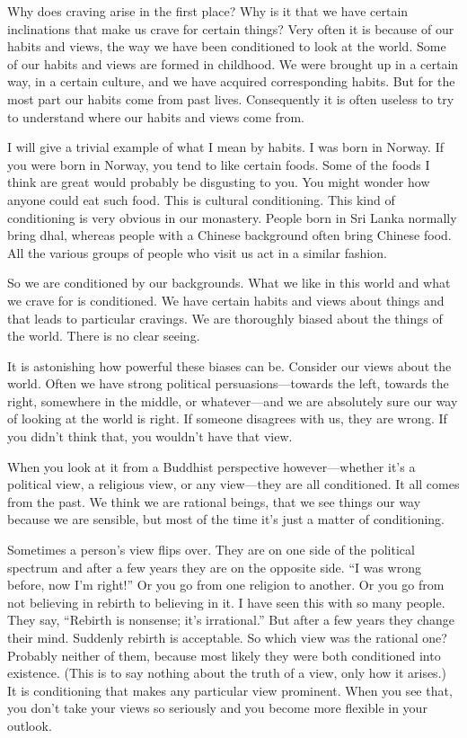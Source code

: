 \documentclass[12pt,openany]{book}
\begin{document}
Why does craving arise in the first place? Why is it that we have certain inclinations that make us crave for certain things? Very often it is because of our habits and views, the way we have been conditioned to look at the world. Some of our habits and views are formed in childhood. We were brought up in a certain way, in a certain culture, and we have acquired corresponding habits. But for the most part our habits come from past lives. Consequently it is often useless to try to understand where our habits and views come from.

I will give a trivial example of what I mean by habits. I was born in Norway. If you were born in Norway, you tend to like certain foods. Some of the foods I think are great would probably be disgusting to you. You might wonder how anyone could eat such food. This is cultural conditioning. This kind of conditioning is very obvious in our monastery. People born in Sri Lanka normally bring dhal, whereas people with a Chinese background often bring Chinese food. All the various groups of people who visit us act in a similar fashion.

So we are conditioned by our backgrounds. What we like in this world and what we crave for is conditioned. We have certain habits and views about things and that leads to particular cravings. We are thoroughly biased about the things of the world. There is no clear seeing.

It is astonishing how powerful these biases can be. Consider our views about the world. Often we have strong political persuasions—towards the left, towards the right, somewhere in the middle, or whatever—and we are absolutely sure our way of looking at the world is right. If someone disagrees with us, they are wrong. If you didn’t think that, you wouldn’t have that view.

When you look at it from a Buddhist perspective however—whether it’s a political view, a religious view, or any view—they are all conditioned. It all comes from the past. We think we are rational beings, that we see things our way because we are sensible, but most of the time it’s just a matter of conditioning.

Sometimes a person’s view flips over. They are on one side of the political spectrum and after a few years they are on the opposite side. “I was wrong before, now I’m right!” Or you go from one religion to another. Or you go from not believing in rebirth to believing in it. I have seen this with so many people. They say, “Rebirth is nonsense; it’s irrational.” But after a few years they change their mind. Suddenly rebirth is acceptable. So which view was the rational one? Probably neither of them, because most likely they were both conditioned into existence. (This is to say nothing about the truth of a view, only how it arises.) It is conditioning that makes any particular view prominent. When you see that, you don’t take your views so seriously and you become more flexible in your outlook.
\end{document}
